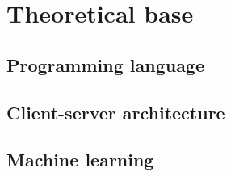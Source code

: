 \section{Theoretical base}

\subsection{Programming language}


\subsection{Client-server architecture}


\subsection{Machine learning}

